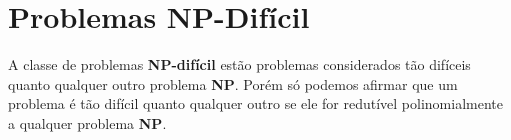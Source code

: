 \section{Problemas NP-Difícil}
A classe de problemas \textbf{NP-difícil} estão problemas considerados tão difíceis quanto qualquer outro problema \textbf{NP}. Porém só podemos afirmar que um problema é tão difícil quanto qualquer outro se ele for redutível polinomialmente a qualquer problema \textbf{NP}.
